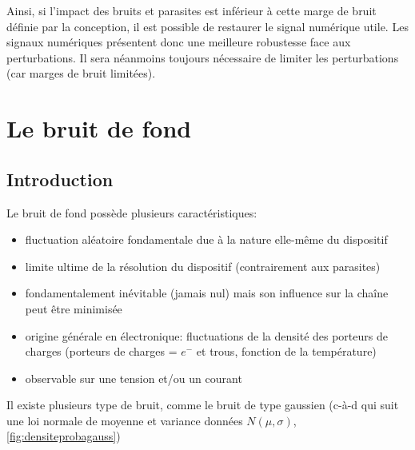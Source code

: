 Ainsi, si l'impact des bruits et parasites est inférieur à cette marge de bruit définie par la conception, il est possible de restaurer le signal numérique utile. Les signaux numériques présentent donc une meilleure robustesse face aux perturbations. Il sera néanmoins toujours nécessaire de limiter les perturbations (car marges de bruit limitées).
\section{Le bruit de fond}
\subsection{Introduction}
Le bruit de fond possède plusieurs caractéristiques:
\begin{itemize}
	\item fluctuation aléatoire fondamentale due à la nature elle-même du dispositif
	\item limite ultime de la résolution du dispositif (contrairement aux parasites)
	\item fondamentalement inévitable (jamais nul) mais son influence sur la chaîne peut être minimisée
	\item origine générale en électronique: fluctuations de la densité des porteurs de charges (porteurs de charges = \(e^-\) et trous, fonction de la température)
	\item observable sur une tension et/ou un courant
\end{itemize}
Il existe plusieurs type de bruit, comme le bruit de type gaussien (c-à-d qui suit une loi normale de moyenne et variance données \(N(\mu,\sigma)\), \autoref{fig:densiteprobagauss})

